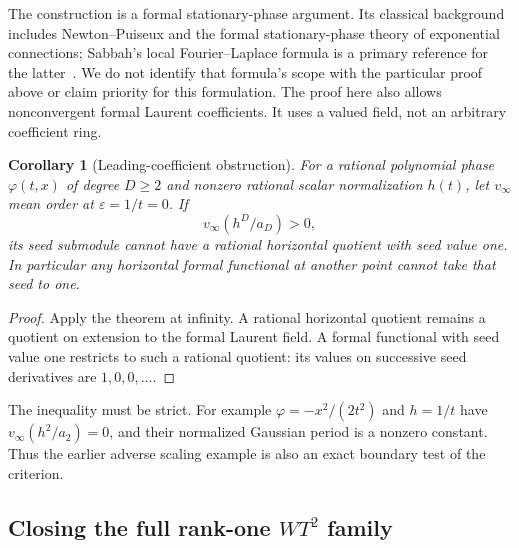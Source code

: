 \documentclass[11pt]{article}
\newtheorem{corollary}[theorem]{Corollary}
\theoremstyle{definition}\newtheorem{definition}[theorem]{Definition}
\theoremstyle{remark}\newtheorem{remark}[theorem]{Remark}
\begin{document}
The construction is a formal stationary-phase argument. Its classical
background includes Newton--Puiseux and the formal stationary-phase
theory of exponential connections; Sabbah's local Fourier--Laplace
formula is a primary reference for the latter~\cite{SabbahStationary}.
We do not identify that formula's scope with the particular proof
above or claim priority for this formulation. The proof here also
allows nonconvergent formal Laurent coefficients. It uses a valued
field, not an arbitrary coefficient ring.

\begin{corollary}[Leading-coefficient obstruction]\label{cor:leadingobstruction}
For a rational polynomial phase $\varphi(t,x)$ of degree $D\geq2$
and nonzero rational scalar normalization $h(t)$, let $v_\infty$
mean order at $\varepsilon=1/t=0$. If
\begin{equation}\label{eq:leadingcriterion}
 v_\infty(h^D/a_D)>0,
\end{equation}
its seed submodule cannot have a rational horizontal quotient with
seed value one. In particular any horizontal formal functional at
another point cannot take that seed to one.
\end{corollary}
\begin{proof}
Apply the theorem at infinity. A rational horizontal quotient remains
a quotient on extension to the formal Laurent field. A formal
functional with seed value one restricts to such a rational quotient:
its values on successive seed derivatives are $1,0,0,\ldots$.
\end{proof}

The inequality must be strict. For example
$\varphi=-x^2/(2t^2)$ and $h=1/t$ have
$v_\infty(h^2/a_2)=0$, and their normalized Gaussian period is a
nonzero constant. Thus the earlier adverse scaling example is also
an exact boundary test of the criterion.

\subsection{Closing the full rank-one $WT^2$ family}\label{sec:rankoneformal}
\end{document}
